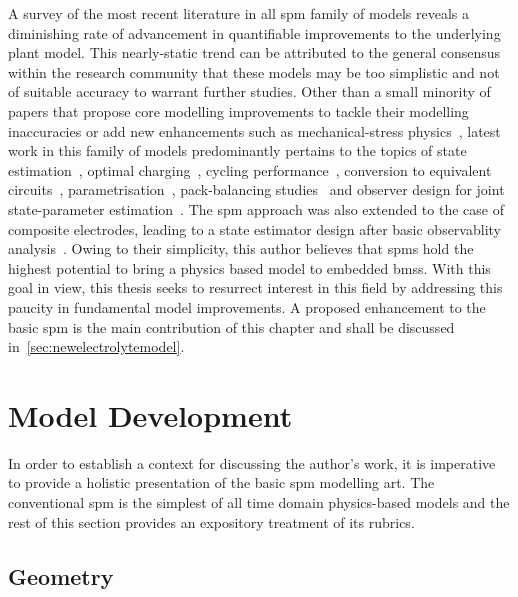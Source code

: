 A  survey of  the  most recent  literature  in all  \gls{spm}  family of  models
reveals  a  diminishing rate  of  advancement  in quantifiable  improvements  to
the  underlying  plant  model.  This   nearly-static  trend  can  be  attributed
to  the  general consensus  within  the  research  community that  these  models
may  be  too  simplistic  and  not  of  suitable  accuracy  to  warrant  further
studies.   Other  than   a  small   minority   of  papers   that  propose   core
modelling  improvements  to  tackle  their modelling  inaccuracies  or  add  new
enhancements  such as  mechanical-stress physics~\cite{Li2017a,Li2018b},  latest
work  in   this  family   of  models  predominantly   pertains  to   the  topics
of    state   estimation~\cite{Chaochun2018,Lin2017,Tran2017,Moura2017,Zou2016},
optimal    charging~\cite{Perez2015},    cycling    performance~\cite{Maia2017},
conversion           to            equivalent           circuits~\cite{Li2017b},
parametrisation~\cite{Li2018,Rajabloo2017,Bizeray2017,Namor2017}, pack-balancing
studies~\cite{Docimo2014}   and  observer   design  for   joint  state-parameter
estimation~\cite{Ascencio2016}. The \gls{spm} approach  was also extended to the
case  of  composite  electrodes,  leading  to a  state  estimator  design  after
basic  observablity  analysis~\cite{Bartlett2015}.  Owing to  their  simplicity,
this  author  believes that  \gls{spm}s  hold  the  highest potential  to  bring
a  physics  based  model  to  embedded  \gls{bms}s.  With  this  goal  in  view,
this  thesis seeks  to  resurrect  interest in  this  field  by addressing  this
paucity in fundamental  model improvements. A proposed enhancement  to the basic
\gls{spm}  is the  main  contribution of  this chapter  and  shall be  discussed
in~\cref{sec:newelectrolytemodel}.

\section{Model Development}\label{sec:spmmodeldevelopment}

In  order  to establish  a  context  for discussing  the  author's  work, it  is
imperative to provide  a holistic presentation of the  basic \gls{spm} modelling
art. The conventional \gls{spm} is the simplest of all time domain physics-based
models and  the rest  of this  section provides an  expository treatment  of its
rubrics.


\subsection{Geometry}\label{subsec:basicspmgeometry}

